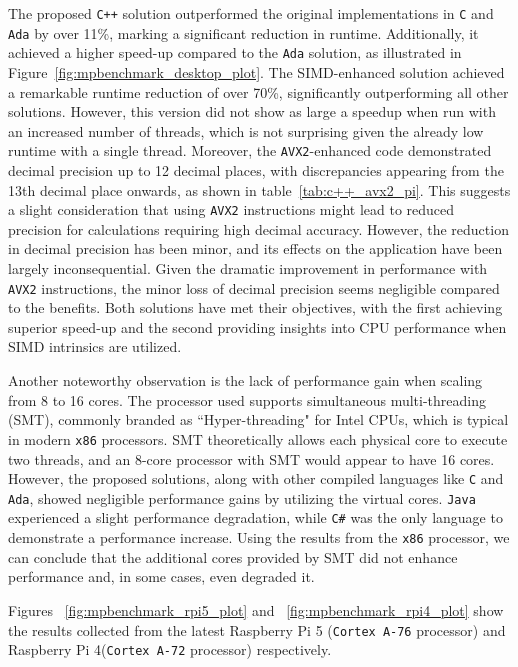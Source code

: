 The proposed \texttt{C++} solution outperformed the original implementations in \texttt{C} and \texttt{Ada} by over 11\%, marking a significant reduction in runtime. Additionally, it achieved a higher speed-up compared to the \texttt{Ada} solution, as illustrated in Figure~\ref{fig:mpbenchmark_desktop_plot}. The SIMD-enhanced solution achieved a remarkable runtime reduction of over 70\%, significantly outperforming all other solutions. However, this version did not show as large a speedup when run with an increased number of threads, which is not surprising given the already low runtime with a single thread. Moreover, the \texttt{AVX2}-enhanced code demonstrated decimal precision up to 12 decimal places, with discrepancies appearing from the 13th decimal place onwards, as shown in table~\ref{tab:c++_avx2_pi}. This suggests a slight consideration that using \texttt{AVX2} instructions might lead to reduced precision for calculations requiring high decimal accuracy. However, the reduction in decimal precision has been minor, and its effects on the application have been largely inconsequential. Given the dramatic improvement in performance with \texttt{AVX2} instructions, the minor loss of decimal precision seems negligible compared to the benefits. Both solutions have met their objectives, with the first achieving superior speed-up and the second providing insights into CPU performance when SIMD intrinsics are utilized.

Another noteworthy observation is the lack of performance gain when scaling from 8 to 16 cores. The processor used supports simultaneous multi-threading (SMT), commonly branded as ``Hyper-threading" for Intel CPUs, which is typical in modern \texttt{x86} processors. SMT theoretically allows each physical core to execute two threads, and an 8-core processor with SMT would appear to have 16 cores. However, the proposed solutions, along with other compiled languages like \texttt{C} and \texttt{Ada}, showed negligible performance gains by utilizing the virtual cores. \texttt{Java} experienced a slight performance degradation, while \texttt{C\#} was the only language to demonstrate a performance increase. Using the results from the \texttt{x86} processor, we can conclude that the additional cores provided by SMT did not enhance performance and, in some cases, even degraded it.

Figures ~\ref{fig:mpbenchmark_rpi5_plot} and ~\ref{fig:mpbenchmark_rpi4_plot} show the results collected from the latest Raspberry Pi 5 (\texttt{Cortex A-76} processor) and Raspberry Pi 4(\texttt{Cortex A-72} processor) respectively.

